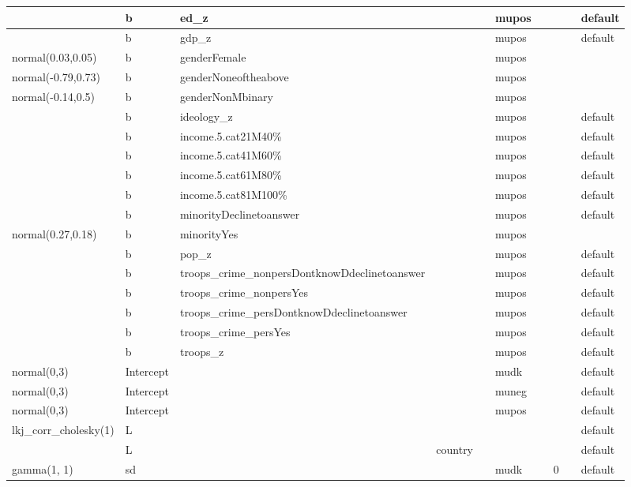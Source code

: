 \documentclass[
]{book}
\theoremstyle{definition}
\theoremstyle{definition}
\theoremstyle{definition}
\theoremstyle{definition}
\theoremstyle{remark}
\begin{document}
\begin{table}
\begin{tabular}[t]{l|l|l|l|l|l|l|l|l|l}
\hline
 & b & ed\_z &  &  & mupos &  &  &  & default\\
\hline
 & b & gdp\_z &  &  & mupos &  &  &  & default\\
\hline
normal(0.03,0.05) & b & genderFemale &  &  & mupos &  &  &  & \\
\hline
normal(-0.79,0.73) & b & genderNoneoftheabove &  &  & mupos &  &  &  & \\
\hline
normal(-0.14,0.5) & b & genderNonMbinary &  &  & mupos &  &  &  & \\
\hline
 & b & ideology\_z &  &  & mupos &  &  &  & default\\
\hline
 & b & income.5.cat21M40\% &  &  & mupos &  &  &  & default\\
\hline
 & b & income.5.cat41M60\% &  &  & mupos &  &  &  & default\\
\hline
 & b & income.5.cat61M80\% &  &  & mupos &  &  &  & default\\
\hline
 & b & income.5.cat81M100\% &  &  & mupos &  &  &  & default\\
\hline
 & b & minorityDeclinetoanswer &  &  & mupos &  &  &  & default\\
\hline
normal(0.27,0.18) & b & minorityYes &  &  & mupos &  &  &  & \\
\hline
 & b & pop\_z &  &  & mupos &  &  &  & default\\
\hline
 & b & troops\_crime\_nonpersDontknowDdeclinetoanswer &  &  & mupos &  &  &  & default\\
\hline
 & b & troops\_crime\_nonpersYes &  &  & mupos &  &  &  & default\\
\hline
 & b & troops\_crime\_persDontknowDdeclinetoanswer &  &  & mupos &  &  &  & default\\
\hline
 & b & troops\_crime\_persYes &  &  & mupos &  &  &  & default\\
\hline
 & b & troops\_z &  &  & mupos &  &  &  & default\\
\hline
normal(0,3) & Intercept &  &  &  & mudk &  &  &  & default\\
\hline
normal(0,3) & Intercept &  &  &  & muneg &  &  &  & default\\
\hline
normal(0,3) & Intercept &  &  &  & mupos &  &  &  & default\\
\hline
lkj\_corr\_cholesky(1) & L &  &  &  &  &  &  &  & default\\
\hline
 & L &  & country &  &  &  &  &  & default\\
\hline
gamma(1, 1) & sd &  &  &  & mudk &  & 0 &  & default\\

\end{tabular}
\end{table}
\end{document}
